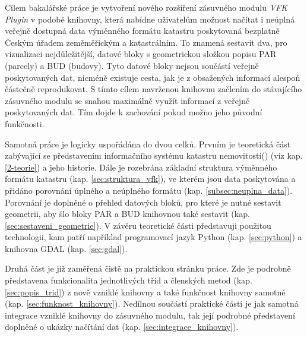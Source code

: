 Cílem bakalářské práce je vytvoření nového rozšíření zásuvného modulu
\textit{VFK Plugin} v podobě knihovny, která nabídne uživatelům
možnost načítat i neúplná veřejně dostupná data výměnného formátu
katastru poskytovaná bezplatně Českým úřadem zeměměřickým a
katastrálním.  To znamená sestavit dva, pro vizualizaci
nejdůležitější, datové bloky s geometrickou složkou popisu PAR
(parcely) a BUD (budovy). Tyto datové bloky nejsou součástí veřejně poskytovaných
dat, nicméně existuje cesta, jak je z obsažených informací alespoň částečně
reprodukovat. S tímto cílem navrženou knihovnu začlením do stávajícího zásuvného modulu
se snahou maximálně využít informací z veřejně poskytovaných dat. Tím dojde k zachování pokud možno jeho původní funkčnosti.

Samotná práce je logicky uspořádána do dvou celků. Prvním je
teoretická část zabývající se představením informačního systému
katastru nemovitostí() (viz kap. \ref{2-teorie}) a jeho
historie. Dále je rozebrána základní struktura výměnného formátu
katastru (kap. \ref{sec:struktura_vfk}), ve kterém jsou data
poskytována a přidáno porovnání úplného a neúplného formátu
(kap. \ref{subsec:neuplna_data}).  Porovnání je doplněné o přehled
datových bloků, pro které je nutné sestavit geometrii, aby šlo bloky
PAR a BUD knihovnou také sestavit
(kap. \ref{sec:sestaveni_geometrie}). V závěru teoretické části
představuji použitou technologii, kam patří například programovací
jazyk Python (kap. \ref{sec:python}) a knihovna GDAL
(kap. \ref{sec:gdal}).

Druhá část je již zaměřená čistě na praktickou stránku práce. Zde je
podrobně představena funkcionalita jednotlivých tříd a členských metod
(kap. \ref{sec:popis_trid}) z nově vzniklé knihovny a také funkčnost
knihovny samotné (kap. \ref{sec:funknost_knihovny}). Nedílnou součástí
praktické části je jak samotná integrace vzniklé knihovny do zásuvného
modulu, tak její podrobné představení doplněné o ukázky načítání dat
(kap. \ref{sec:integrace_knihovny}).
